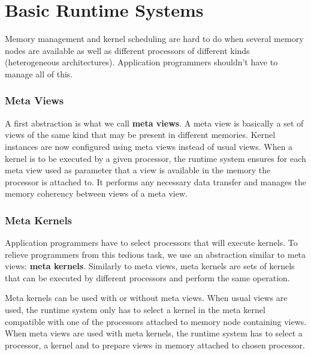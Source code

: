 \chapter{Basic Runtime Systems}

Memory management and kernel scheduling are hard to do when several memory nodes
are available as well as different processors of different kinds (heterogeneous
architectures). Application programmers shouldn't have to manage all of this.

\subsection{Meta Views}
A first abstraction is what we call \textbf{meta views}. A meta view is
basically a set of views of the same kind that may be present in different
memories. Kernel instances are now configured using meta views instead of usual
views. When a kernel is to be executed by a given processor, the runtime system
ensures for each meta view used as parameter that a view is available in the
memory the processor is attached to. It performs any necessary data transfer and
manages the memory coherency between views of a meta view.

\subsection{Meta Kernels}
Application programmers have to select processors that will execute kernels. To
relieve programmers from this tedious task, we use an abstraction similar to
meta views: \textbf{meta kernels}. Similarly to meta views, meta kernels are
sets of kernels that can be executed by different processors and perform the
same operation.

Meta kernels can be used with or without meta views. When usual views are used,
the runtime system only has to select a kernel in the meta kernel compatible
with one of the processors attached to memory node containing views. When meta
views are used with meta kernels, the runtime system has to select a processor,
a kernel and to prepare views in memory attached to chosen processor.
